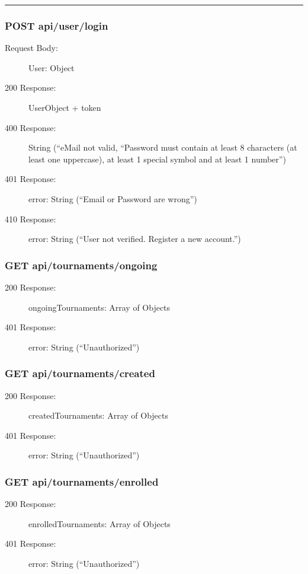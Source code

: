 \documentclass{Configuration_Files/Template}
\begin{document}
{\color{bluepoli}\rule{\linewidth}{0.1pt}}


\subsubsection{POST api/user/login}
\begin{description}
    \item[Request Body:] User: Object
    \item[200 Response:] UserObject + token
    \item[400 Response:] String (“eMail not valid, “Password must contain at least 8 characters (at least one uppercase), at least 1 special symbol and at least 1 number”)
    \item[401 Response:] error: String (“Email or Password are wrong”)
    \item[410 Response:] error: String (“User not verified. Register a new account.”)
\end{description}

\subsubsection{GET api/tournaments/ongoing}
\begin{description}
    \item[200 Response:] ongoingTournaments: Array of Objects
    \item[401 Response:] error: String (“Unauthorized”)
\end{description}

\subsubsection{GET api/tournaments/created}
\begin{description}
    \item[200 Response:] createdTournaments: Array of Objects
    \item[401 Response:] error: String (“Unauthorized”)
\end{description}

\subsubsection{GET api/tournaments/enrolled}
\begin{description}
    \item[200 Response:] enrolledTournaments: Array of Objects
    \item[401 Response:] error: String (“Unauthorized”)
\end{description}
\end{document}

